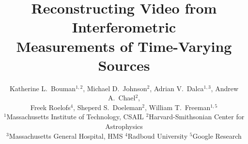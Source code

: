 \documentclass[journal]{IEEEtran}
\begin{document}
\title{Reconstructing Video from Interferometric \\ Measurements of Time-Varying Sources}



\author{Katherine L.\ Bouman$^{1,2}$, 
	Michael D.\ Johnson$^2$, 
	Adrian V.\ Dalca$^{1,3}$,
	Andrew A.\ Chael$^2$,  \\
	Freek Roelofs$^{4}$, 
	Sheperd S.\ Doeleman$^2$,
	William T.\ Freeman$^{1,5}$\\ \vspace{0.1in}
    {\small
	$^1${Massachusetts Institute of Technology, CSAIL}
	$^2${Harvard-Smithsonian Center for Astrophysics} \\
    $^3${Massachusetts General Hospital, HMS}
    $^4${Radboud University}
    $^5${Google Research} \vspace{-0.3in}
    }
}


\maketitle


	
\end{document}
